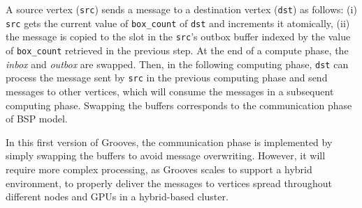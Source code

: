 A source vertex (\texttt{src}) sends a message to a destination vertex (\texttt{dst}) as follows: (i) \texttt{src} gets the current value of \texttt{box\_count} of \texttt{dst} and increments it atomically, (ii) the message is copied to the slot in the \texttt{src}’s outbox buffer indexed by the value of \texttt{box\_count} retrieved in the previous step. At the end of a compute phase, the \emph{inbox} and \emph{outbox} are swapped. Then, in the following computing phase, \texttt{dst} can process the message sent by \texttt{src} in the previous computing phase and send messages to other vertices, which will consume the messages in a subsequent computing phase. Swapping the buffers corresponds to the communication phase of BSP model. 

In this first version of {\sc Grooves}, the communication phase is implemented by simply swapping the buffers to avoid message overwriting. However, it will require more complex processing, as {\sc Grooves} scales to support a hybrid environment, to properly deliver the messages to vertices spread throughout different nodes and GPUs in a hybrid-based cluster. 
